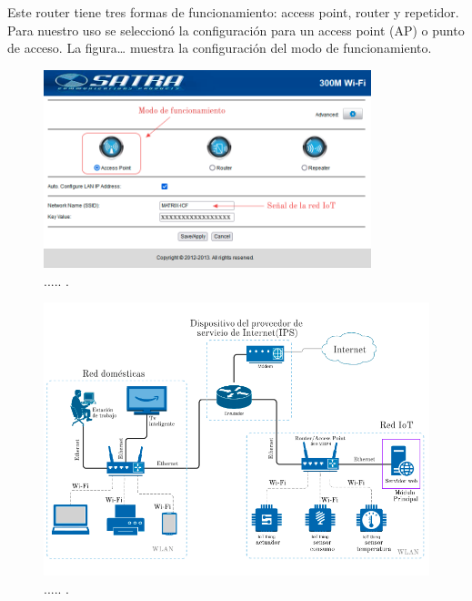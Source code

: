 Este router tiene tres formas de funcionamiento: access point, router y repetidor. Para nuestro uso se seleccionó la configuración para un access point (AP) o punto de acceso. La figura… muestra la configuración del modo de funcionamiento.

\begin{figure}[htpb]
\centering 
\includegraphics[width=0.85\textwidth]{./Figures/funcionamientorouter.png}
\caption{..... .}
\label{fig:funcionamientorouter}
\end{figure}

\begin{landscape} %
\begin{figure}[htpb]
\centering 
\includegraphics[width=1.3\textwidth]{./Figures/rediot.png}
\caption{..... .}
\label{fig:diagramared}
\end{figure}
\end{landscape} %

